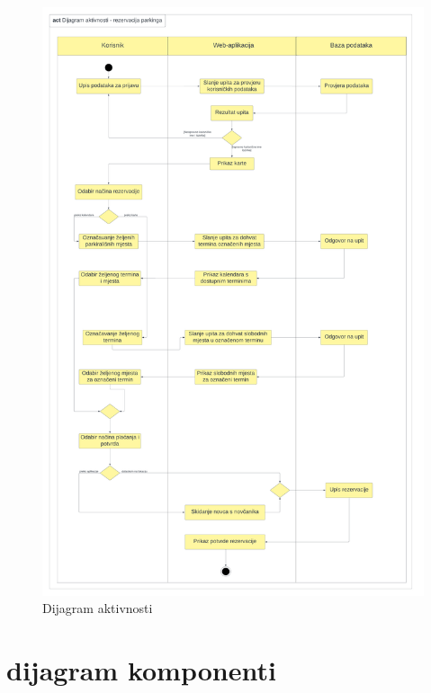 \begin{figure}[h!]
	\centering
	\includegraphics[width=1\linewidth]{dijagrami/DijagramAktivnosti.png}
	\caption{Dijagram aktivnosti}
	\label{fig:activitydiagram}
	\vfill
\end{figure}

\FloatBarrier

\section{dijagram komponenti}

